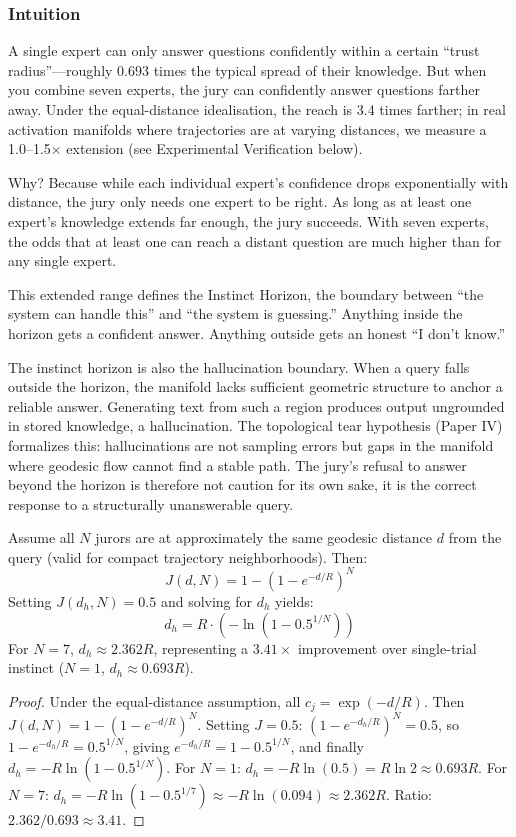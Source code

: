 \documentclass[11pt]{article}
\begin{document}
\subsubsection*{Intuition}

A single expert can only answer questions confidently within a certain
``trust radius''---roughly $0.693$ times the typical spread of their knowledge.
But when you combine seven experts, the jury can
confidently answer questions farther away. Under the equal-distance idealisation,
the reach is 3.4 times farther; in real activation manifolds where trajectories
are at varying distances, we measure a 1.0--1.5$\times$ extension (see Experimental Verification below).

Why? Because while each individual expert's confidence drops exponentially with
distance, the jury only needs one expert to be right. As long as at
least one expert's knowledge extends far enough, the jury succeeds. With seven
experts, the odds that at least one can reach a distant question are much higher
than for any single expert.

This extended range defines the Instinct Horizon, the boundary between
``the system can handle this'' and ``the system is guessing.'' Anything inside
the horizon gets a confident answer. Anything outside gets an honest ``I don't
know.''

The instinct horizon is also the hallucination boundary. When a query
falls outside the horizon, the manifold lacks sufficient geometric structure to
anchor a reliable answer. Generating text from such a region produces output
ungrounded in stored knowledge, a hallucination. The topological tear
hypothesis (Paper IV) formalizes this: hallucinations are not sampling errors
but gaps in the manifold where geodesic flow cannot find a stable path. The
jury's refusal to answer beyond the horizon is therefore not caution for its
own sake, it is the correct response to a structurally unanswerable query.

\begin{theorem}\label{thm:horizon}
Assume all $N$ jurors are at approximately the same geodesic distance $d$ from the query (valid for compact trajectory neighborhoods). Then:
\begin{equation}
J(d, N) = 1 - (1 - e^{-d/R})^N
\end{equation}
Setting $J(d_h, N) = 0.5$ and solving for $d_h$ yields:
\begin{equation}\label{eq:horizon}
d_h = R \cdot (-\ln(1 - 0.5^{1/N}))
\end{equation}
For $N=7$, $d_h \approx 2.362 R$, representing a $3.41\times$ improvement over single-trial instinct ($N=1$, $d_h \approx 0.693 R$).
\end{theorem}
\begin{proof}
Under the equal-distance assumption, all $c_j = \exp(-d/R)$. Then $J(d,N) = 1 - (1 - e^{-d/R})^N$. Setting $J = 0.5$: $(1 - e^{-d_h/R})^N = 0.5$, so $1 - e^{-d_h/R} = 0.5^{1/N}$, giving $e^{-d_h/R} = 1 - 0.5^{1/N}$, and finally $d_h = -R \ln(1 - 0.5^{1/N})$. For $N=1$: $d_h = -R \ln(0.5) = R \ln 2 \approx 0.693R$. For $N=7$: $d_h = -R \ln(1 - 0.5^{1/7}) \approx -R \ln(0.094) \approx 2.362R$. Ratio: $2.362/0.693 \approx 3.41$.
\end{proof}
\end{document}
